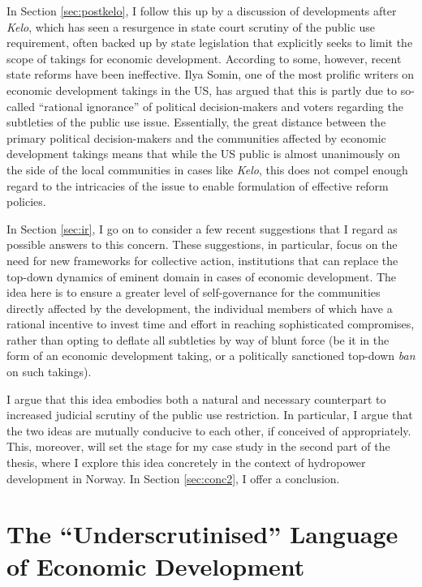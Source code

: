 In Section \ref{sec:postkelo}, I follow this up by a discussion of developments after {\it Kelo}, which has seen a resurgence in state court scrutiny of the public use requirement, often backed up by state legislation that explicitly seeks to limit the scope of takings for economic development. According to some, however, recent state reforms have been ineffective. Ilya Somin, one of the most prolific writers on economic development takings in the US, has argued that this is partly due to so-called ``rational ignorance'' of political decision-makers and voters regarding the subtleties of the public use issue. Essentially, the great distance between the primary political decision-makers and the communities affected by economic development takings means that while the US public is almost unanimously on the side of the local communities in cases like {\it Kelo}, this does not compel enough regard to the intricacies of the issue to enable formulation of effective reform policies.

In Section \ref{sec:ir}, I go on to consider a few recent suggestions that I regard as possible answers to this concern. These suggestions, in particular, focus on the need for new frameworks for collective action, institutions that can replace the top-down dynamics of eminent domain in cases of economic development. The idea here is to ensure a greater level of self-governance for the communities directly affected by the development, the individual members of which have a rational incentive to invest time and effort in reaching sophisticated compromises, rather than opting to deflate all subtleties by way of blunt force (be it in the form of an economic development taking, or a politically sanctioned top-down {\it ban} on such takings).

I argue that this idea embodies both a natural and necessary counterpart to increased judicial scrutiny of the public use restriction. In particular, I argue that the two ideas are mutually conducive to each other, if conceived of appropriately. This, moreover, will set the stage for my case study in the second part of the thesis, where I explore this idea concretely in the context of hydropower development in Norway. In Section \ref{sec:conc2}, I offer a conclusion.

\section{The ``Underscrutinised'' Language of Economic Development}\label{sec:lgppp}

